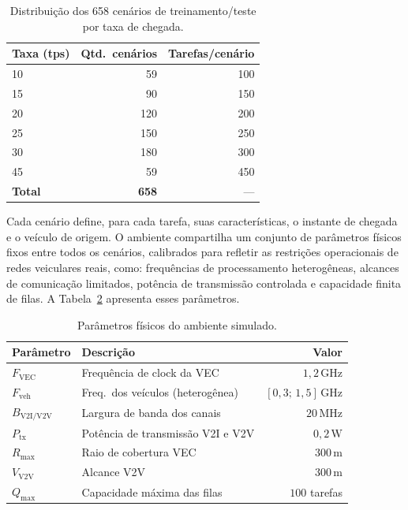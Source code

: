 \begin{table}[htb]
\centering
\caption{Distribuição dos 658 cenários de treinamento/teste por taxa de chegada.}
\label{tab:cenarios}
\begin{tabular}{lrr}
\toprule
\textbf{Taxa (tps)} & \textbf{Qtd.\ cenários} & \textbf{Tarefas/cenário} \\
\midrule
10  &  59 & 100 \\
15  &  90 & 150 \\
20  & 120 & 200 \\
25  & 150 & 250 \\
30  & 180 & 300 \\
45  &  59 & 450 \\
\midrule
\textbf{Total} & \textbf{658} & --- \\
\bottomrule
\end{tabular}
\end{table}

Cada cenário define, para cada tarefa, suas características, o instante de chegada e o veículo de origem. O ambiente compartilha um conjunto de parâmetros físicos fixos entre todos os cenários, calibrados para refletir as restrições operacionais de redes veiculares reais, como: frequências de processamento heterogêneas, alcances de comunicação limitados, potência de transmissão controlada e capacidade finita de filas. A Tabela~\ref{tab:system-params} apresenta esses parâmetros.

\begin{table}[htb]
\centering
\caption{Parâmetros físicos do ambiente simulado.}
\label{tab:system-params}
\begin{tabular}{llr}
\toprule
\textbf{Parâmetro} & \textbf{Descrição} & \textbf{Valor} \\
\midrule
$F_{\text{VEC}}$      & Frequência de clock da \gls{VEC}                & $1{,}2\,\text{GHz}$   \\
$F_{\text{veh}}$      & Freq.\ dos veículos (heterogênea)         & $[0{,}3;\,1{,}5]\,\text{GHz}$ \\
$B_{\text{V2I/V2V}}$  & Largura de banda dos canais               & $20\,\text{MHz}$      \\
$P_{\text{tx}}$       & Potência de transmissão \gls{V2I} e \gls{V2V}         & $0{,}2\,\text{W}$    \\
$R_{\max}$            & Raio de cobertura \gls{VEC}                     & $300\,\text{m}$      \\
$V_{\text{V2V}}$      & Alcance \gls{V2V}                               & $300\,\text{m}$      \\
$Q_{\max}$            & Capacidade máxima das filas               & $100$ tarefas        \\
\bottomrule
\end{tabular}
\end{table}

